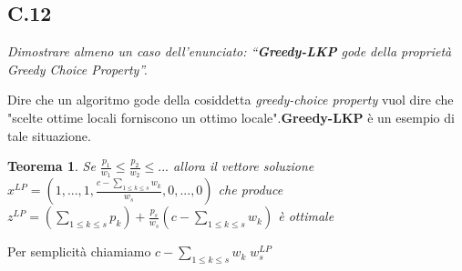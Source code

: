 \documentclass[a4paper]{article}
\newtheorem*{theorem}{Teorema}
\begin{document}
\subsection{C.12}
\emph{Dimostrare almeno un caso dell'enunciato: “\textbf{Greedy-LKP} gode della proprietà Greedy Choice Property”.}


Dire che un algoritmo gode della cosiddetta \textit{greedy-choice property} vuol dire che "scelte ottime locali forniscono un ottimo locale".\textbf{Greedy-LKP} è un esempio di tale situazione.
\begin{theorem}
	Se $\frac{p_1}{w_1} \leq \frac{p_2}{w_2} \leq ...$ allora il vettore soluzione 
	$x^{LP}= (1, ... ,1,\frac{c- \sum_{1 \leq k \leq s}w_k}{w_s} ,0, ... ,0)$ che produce
	$z^{LP} = (\sum_{1 \leq k \leq s} p_k)+\frac{p_s}{w_s}(c- \sum_{1 \leq k \leq s}w_k)$ è ottimale 
\end{theorem}
Per semplicità chiamiamo $c- \sum_{1 \leq k \leq s}w_k \; w_s^{LP}$
\end{document}
